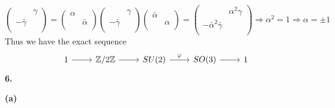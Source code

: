 \documentclass[10pt]{article}
\newcommand{\<}[1]{\langle #1 \rangle}
\begin{document}
$$
\left( {\begin{array}{cc}
    & \gamma  \\
    -\bar\gamma &  \\
  \end{array} } \right)=\left( {\begin{array}{cc}
   \alpha &  \\
     & \bar\alpha \\
  \end{array} } \right)\left( {\begin{array}{cc}
    & \gamma  \\
    -\bar\gamma &  \\
  \end{array} } \right)\left( {\begin{array}{cc}
   \bar\alpha &   \\
     & \alpha \\
  \end{array} } \right)=\left( {\begin{array}{cc}
    & \alpha^2\gamma  \\
    -\bar\alpha^2\bar\gamma &  \\
  \end{array} } \right)\Rightarrow \alpha^2=1\Rightarrow \alpha=\pm1
$$
Thus we have the exact sequence
$$
\begin{tikzcd}
1 \arrow[r] & \mathbb{Z}/2\mathbb{Z} \arrow[r] & SU(2) \arrow[r, "\varphi"] & SO(3) \arrow[r] & 1
\end{tikzcd}
$$
\textbf{6.} \par
\textbf{(a)} \par
\end{document}
